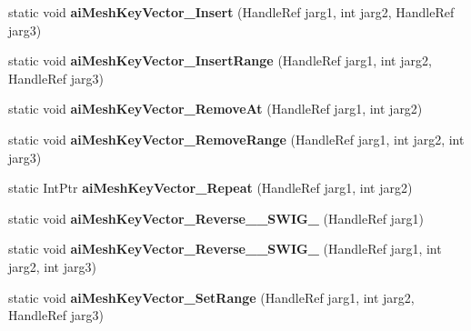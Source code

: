 \begin{DoxyCompactItemize}
\item 
\hypertarget{class_assimp_p_i_n_v_o_k_e_a4fd32355c85cda1de2b3a5a210c8a103}{static void {\bfseries ai\+Mesh\+Key\+Vector\+\_\+\+Insert} (Handle\+Ref jarg1, int jarg2, Handle\+Ref jarg3)}\label{class_assimp_p_i_n_v_o_k_e_a4fd32355c85cda1de2b3a5a210c8a103}

\item 
\hypertarget{class_assimp_p_i_n_v_o_k_e_a6afe1c06c6d82d5a86c9f1b1b9f2b119}{static void {\bfseries ai\+Mesh\+Key\+Vector\+\_\+\+Insert\+Range} (Handle\+Ref jarg1, int jarg2, Handle\+Ref jarg3)}\label{class_assimp_p_i_n_v_o_k_e_a6afe1c06c6d82d5a86c9f1b1b9f2b119}

\item 
\hypertarget{class_assimp_p_i_n_v_o_k_e_ab816852cfb418714745e4f4ba1eb5878}{static void {\bfseries ai\+Mesh\+Key\+Vector\+\_\+\+Remove\+At} (Handle\+Ref jarg1, int jarg2)}\label{class_assimp_p_i_n_v_o_k_e_ab816852cfb418714745e4f4ba1eb5878}

\item 
\hypertarget{class_assimp_p_i_n_v_o_k_e_a5445bf576e13a3857d6dc4414541ecec}{static void {\bfseries ai\+Mesh\+Key\+Vector\+\_\+\+Remove\+Range} (Handle\+Ref jarg1, int jarg2, int jarg3)}\label{class_assimp_p_i_n_v_o_k_e_a5445bf576e13a3857d6dc4414541ecec}

\item 
\hypertarget{class_assimp_p_i_n_v_o_k_e_abbd66be5aeca88f06f71ee9e0b9f22e9}{static Int\+Ptr {\bfseries ai\+Mesh\+Key\+Vector\+\_\+\+Repeat} (Handle\+Ref jarg1, int jarg2)}\label{class_assimp_p_i_n_v_o_k_e_abbd66be5aeca88f06f71ee9e0b9f22e9}

\item 
\hypertarget{class_assimp_p_i_n_v_o_k_e_aa242f4089da6e42c8ffd3b3c1a291291}{static void {\bfseries ai\+Mesh\+Key\+Vector\+\_\+\+Reverse\+\_\+\+\_\+\+S\+W\+I\+G\+\_} (Handle\+Ref jarg1)}\label{class_assimp_p_i_n_v_o_k_e_aa242f4089da6e42c8ffd3b3c1a291291}

\item 
\hypertarget{class_assimp_p_i_n_v_o_k_e_a6e9c251a81c1ef562dbc9cf566c16adb}{static void {\bfseries ai\+Mesh\+Key\+Vector\+\_\+\+Reverse\+\_\+\+\_\+\+S\+W\+I\+G\+\_} (Handle\+Ref jarg1, int jarg2, int jarg3)}\label{class_assimp_p_i_n_v_o_k_e_a6e9c251a81c1ef562dbc9cf566c16adb}

\item 
\hypertarget{class_assimp_p_i_n_v_o_k_e_a0667dbb52ec385b93b07527c620518f2}{static void {\bfseries ai\+Mesh\+Key\+Vector\+\_\+\+Set\+Range} (Handle\+Ref jarg1, int jarg2, Handle\+Ref jarg3)}\label{class_assimp_p_i_n_v_o_k_e_a0667dbb52ec385b93b07527c620518f2}


\end{DoxyCompactItemize}
